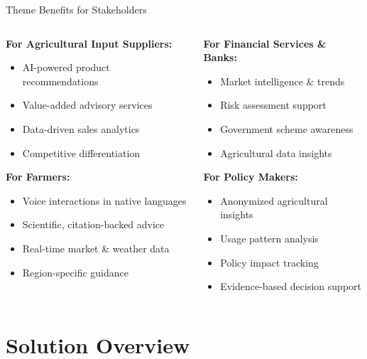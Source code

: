 \documentclass[aspectratio=169]{beamer}
\begin{document}
\begin{frame}{Theme Benefits for Stakeholders}
\begin{columns}
\begin{column}{0.5\textwidth}
\textbf{For Agricultural Input Suppliers:}
\begin{itemize}
\item AI-powered product recommendations
\item Value-added advisory services
\item Data-driven sales analytics
\item Competitive differentiation
\end{itemize}

\textbf{For Farmers:}
\begin{itemize}
\item Voice interactions in native languages
\item Scientific, citation-backed advice
\item Real-time market \& weather data
\item Region-specific guidance
\end{itemize}
\end{column}
\begin{column}{0.5\textwidth}
\textbf{For Financial Services \& Banks:}
\begin{itemize}
\item Market intelligence \& trends
\item Risk assessment support
\item Government scheme awareness
\item Agricultural data insights
\end{itemize}

\textbf{For Policy Makers:}
\begin{itemize}
\item Anonymized agricultural insights
\item Usage pattern analysis
\item Policy impact tracking
\item Evidence-based decision support
\end{itemize}
\end{column}
\end{columns}
\end{frame}

\section{Solution Overview}
\end{document}
